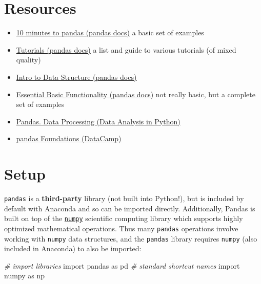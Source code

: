 \documentclass[]{book}
\newenvironment{Shaded}{\begin{snugshade}}{\end{snugshade}}
\newcommand{\ImportTok}[1]{#1}
\newcommand{\CommentTok}[1]{\textcolor[rgb]{0.56,0.35,0.01}{\textit{#1}}}
\newcommand{\NormalTok}[1]{#1}
\providecommand{\tightlist}{%
  \setlength{\itemsep}{0pt}\setlength{\parskip}{0pt}}
\begin{document}
\section{Resources}\label{resources-6}

\begin{itemize}
\tightlist
\item
  \href{http://pandas.pydata.org/pandas-docs/stable/10min.html}{10
  minutes to pandas (pandas docs)} a basic set of examples
\item
  \href{http://pandas.pydata.org/pandas-docs/stable/tutorials.html}{Tutorials
  (pandas docs)} a list and guide to various tutorials (of mixed
  quality)
\item
  \href{http://pandas.pydata.org/pandas-docs/stable/dsintro.html}{Intro
  to Data Structure (pandas docs)}
\item
  \href{http://pandas.pydata.org/pandas-docs/stable/basics.html}{Essential
  Basic Functionality (pandas docs)} not really basic, but a complete
  set of examples
\item
  \href{http://dataanalysispython.readthedocs.io/en/latest/pandas.html}{Pandas.
  Data Processing (Data Analysis in Python)}
\item
  \href{https://www.datacamp.com/courses/pandas-foundations/}{pandas
  Foundations (DataCamp)}
\end{itemize}

\hypertarget{setup}{\section{Setup}\label{setup}}

\texttt{pandas} is a \textbf{third-party} library (not built into
Python!), but is included by default with Anaconda and so can be
imported directly. Additionally, Pandas is built on top of the
\href{http://www.numpy.org/}{\texttt{numpy}} scientific computing
library which supports highly optimized mathematical operations. Thus
many \texttt{pandas} operations involve working with \texttt{numpy} data
structures, and the \texttt{pandas} library requires \texttt{numpy}
(also included in Anaconda) to also be imported:

\begin{Shaded}
\begin{Highlighting}[]
\CommentTok{# import libraries}
\ImportTok{import}\NormalTok{ pandas }\ImportTok{as}\NormalTok{ pd  }\CommentTok{# standard shortcut names}
\ImportTok{import}\NormalTok{ numpy }\ImportTok{as}\NormalTok{ np}
\end{Highlighting}
\end{Shaded}
\end{document}
